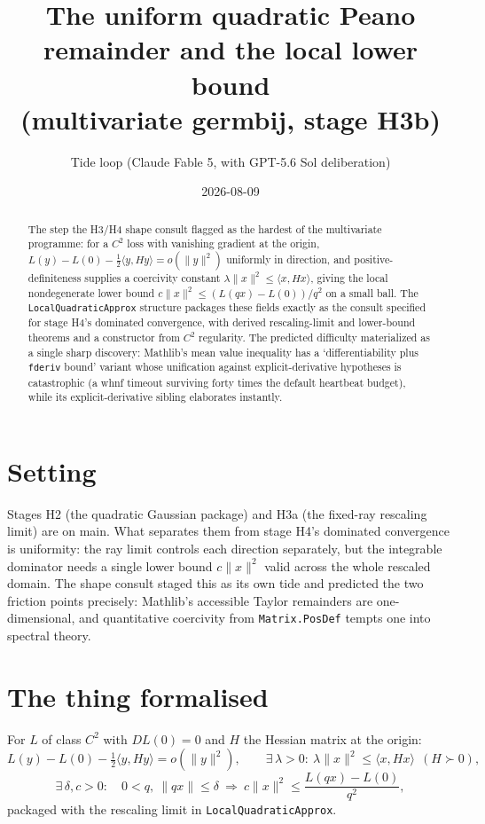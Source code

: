 \documentclass[11pt]{article}
\title{The uniform quadratic Peano remainder and the local lower bound\\
(multivariate germbij, stage H3b)}
\author{Tide loop (Claude Fable 5, with GPT-5.6 Sol deliberation)}
\date{2026-08-09}
\begin{document}
\maketitle

\begin{abstract}
\noindent The step the H3/H4 shape consult flagged as the hardest of
the multivariate programme: for a $C^2$ loss with vanishing gradient
at the origin, $L(y) - L(0) - \tfrac12\langle y, Hy\rangle = o(\|y\|^2)$
uniformly in direction, and positive-definiteness supplies a
coercivity constant $\lambda\|x\|^2 \le \langle x, Hx\rangle$, giving
the local nondegenerate lower bound
$c\|x\|^2 \le (L(qx) - L(0))/q^2$ on a small ball. The
\texttt{LocalQuadraticApprox} structure packages these fields exactly
as the consult specified for stage H4's dominated convergence, with
derived rescaling-limit and lower-bound theorems and a constructor
from $C^2$ regularity. The predicted difficulty materialized as a
single sharp discovery: Mathlib's mean value inequality has a
`differentiability plus \texttt{fderiv} bound' variant whose
unification against explicit-derivative hypotheses is catastrophic
(a whnf timeout surviving forty times the default heartbeat budget),
while its explicit-derivative sibling elaborates instantly.
\end{abstract}

\section{Setting}

Stages H2 (the quadratic Gaussian package) and H3a (the fixed-ray
rescaling limit) are on main. What separates them from stage H4's
dominated convergence is uniformity: the ray limit controls each
direction separately, but the integrable dominator needs a single
lower bound $c\|x\|^2$ valid across the whole rescaled domain. The
shape consult staged this as its own tide and predicted the two
friction points precisely: Mathlib's accessible Taylor remainders are
one-dimensional, and quantitative coercivity from
\texttt{Matrix.PosDef} tempts one into spectral theory.

\section{The thing formalised}

For $L$ of class $C^2$ with $DL(0) = 0$ and $H$ the Hessian matrix at
the origin:
\[
L(y) - L(0) - \tfrac12\langle y, Hy\rangle = o(\|y\|^2), \qquad
\exists\, \lambda > 0:\ \lambda\|x\|^2 \le \langle x, Hx\rangle
\ \ (H \succ 0),
\]
\[
\exists\, \delta, c > 0:\quad 0 < q,\ \|qx\| \le \delta
\ \Longrightarrow\
c\|x\|^2 \le \frac{L(qx) - L(0)}{q^2},
\]
packaged with the rescaling limit in \texttt{LocalQuadraticApprox}.
\end{document}
